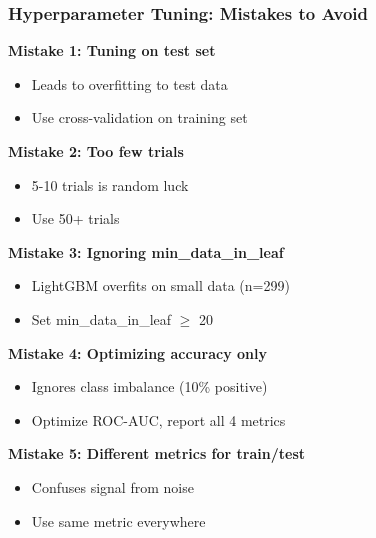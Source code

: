 \documentclass{beamer}
\begin{document}
\begin{frame}[fragile]
\frametitle{Hyperparameter Tuning: Mistakes to Avoid}

\textbf{Mistake 1: Tuning on test set}
\begin{itemize}
    \item \textcolor{red}{} Leads to overfitting to test data
    \item \textcolor{green}{\checkmark} Use cross-validation on training set
\end{itemize}

\textbf{Mistake 2: Too few trials}
\begin{itemize}
    \item \textcolor{red}{} 5-10 trials is random luck
    \item \textcolor{green}{\checkmark} Use 50+ trials
\end{itemize}

\textbf{Mistake 3: Ignoring min\_data\_in\_leaf}
\begin{itemize}
    \item \textcolor{red}{} LightGBM overfits on small data (n=299)
    \item \textcolor{green}{\checkmark} Set min\_data\_in\_leaf $\geq$ 20
\end{itemize}

\textbf{Mistake 4: Optimizing accuracy only}
\begin{itemize}
    \item \textcolor{red}{} Ignores class imbalance (10\% positive)
    \item \textcolor{green}{\checkmark} Optimize ROC-AUC, report all 4 metrics
\end{itemize}

\textbf{Mistake 5: Different metrics for train/test}
\begin{itemize}
    \item \textcolor{red}{} Confuses signal from noise
    \item \textcolor{green}{\checkmark} Use same metric everywhere
\end{itemize}

\end{frame}
\end{document}
